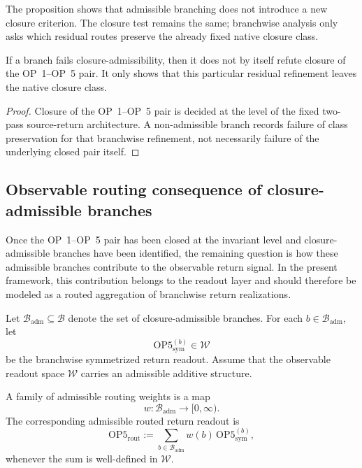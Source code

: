 \begin{remark}
The proposition shows that admissible branching does not introduce a new closure criterion. The closure test remains the same; branchwise analysis only asks which residual routes preserve the already fixed native closure class.
\end{remark}

\begin{corollary}
If a branch fails closure-admissibility, then it does not by itself refute closure of the OP~1--OP~5 pair. It only shows that this particular residual refinement leaves the native closure class.
\end{corollary}

\begin{proof}
Closure of the OP~1--OP~5 pair is decided at the level of the fixed two-pass source-return architecture. A non-admissible branch records failure of class preservation for that branchwise refinement, not necessarily failure of the underlying closed pair itself.
\end{proof}

\subsection{Observable routing consequence of closure-admissible branches}

Once the OP~1--OP~5 pair has been closed at the invariant level and closure-admissible branches have been identified, the remaining question is how these admissible branches contribute to the observable return signal. In the present framework, this contribution belongs to the readout layer and should therefore be modeled as a routed aggregation of branchwise return realizations.

Let $\mathcal{B}_{\mathrm{adm}}\subseteq\mathcal{B}$ denote the set of closure-admissible branches. For each $b\in\mathcal{B}_{\mathrm{adm}}$, let
\[
\mathrm{OP5}^{(b)}_{\mathrm{sym}}\in\mathcal{W}
\]
be the branchwise symmetrized return readout. Assume that the observable readout space $\mathcal{W}$ carries an admissible additive structure.

\begin{definition}
A family of admissible routing weights is a map
\[
w:\mathcal{B}_{\mathrm{adm}}\to [0,\infty).
\]
The corresponding admissible routed return readout is
\[
\mathrm{OP5}_{\mathrm{rout}}
:=
\sum_{b\in\mathcal{B}_{\mathrm{adm}}} w(b)\,\mathrm{OP5}^{(b)}_{\mathrm{sym}},
\]
whenever the sum is well-defined in $\mathcal{W}$.
\end{definition}

